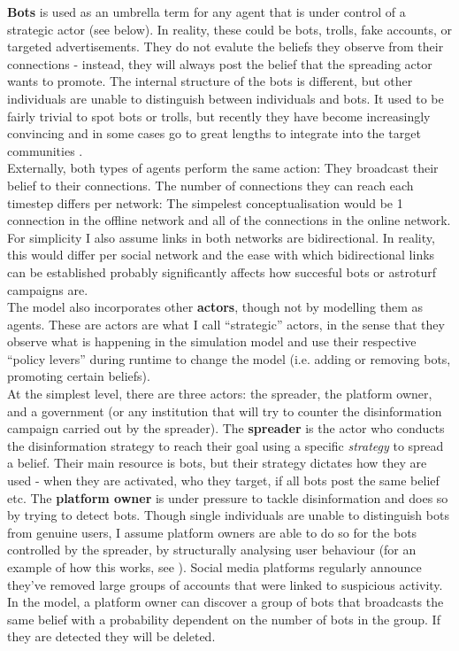 \documentclass[10pt,a4paper]{article}
\begin{document}
\textbf{Bots} is used as an umbrella term for any agent that is under control of a strategic actor (see below). In reality, these could be bots, trolls, fake accounts, or targeted advertisements. They do not evalute the beliefs they observe from their connections - instead, they will always post the belief that the spreading actor wants to promote. The internal structure of the bots is different, but other individuals are unable to distinguish between individuals and bots. It used to be fairly trivial to spot bots or trolls, but recently they have become increasingly convincing and in some cases go to great lengths to integrate into the target communities \citep{Starbird2019}. \\

Externally, both types of agents perform the same action: They broadcast their belief to their connections. The number of connections they can reach each timestep differs per network: The simpelest conceptualisation would be 1 connection in the offline network and all of the connections in the online network. For simplicity I also assume links in both networks are bidirectional. In reality, this would differ per social network and the ease with which bidirectional links can be established probably significantly affects how succesful bots or astroturf campaigns are. \\

The model also incorporates other \textbf{actors}, though not by modelling them as agents. These are actors are what I call ``strategic'' actors, in the sense that they observe what is happening in the simulation model and use their respective ``policy levers'' during runtime to change the model (i.e. adding or removing bots, promoting certain beliefs). \\

At the simplest level, there are three actors: the spreader, the platform owner, and a government (or any institution that will try to counter the disinformation campaign carried out by the spreader). The \textbf{spreader} is the actor who conducts the disinformation strategy to reach their goal using a specific \textit{strategy} to spread a belief. Their main resource is bots, but their strategy dictates how they are used - when they are activated, who they target, if all bots post the same belief etc. The \textbf{platform owner} is under pressure to tackle disinformation and does so by trying to detect bots. Though single individuals are unable to distinguish bots from genuine users, I assume platform owners are able to do so for the bots controlled by the spreader, by structurally analysing user behaviour (for an example of how this works, see \cite{beutel2013copycatch}). Social media platforms regularly announce they've removed large groups of accounts that were linked to suspicious activity. In the model, a platform owner can discover a group of bots that broadcasts the same belief with a probability dependent on the number of bots in the group. If they are detected they will be deleted. \\
\end{document}
